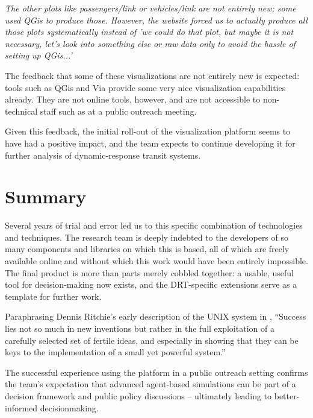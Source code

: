 \begin{displayquote}\emph{
  The other plots like passengers/link or vehicles/link are not entirely new; some used QGis to produce those. However, the website forced us to actually produce all those plots systematically instead of 'we could do that plot, but maybe it is not necessary, let's look into something else or raw data only to avoid the hassle of setting up QGis...'
}\end{displayquote}

\normalsize

The feedback that some of these visualizations are not entirely new is expected: tools such as QGis and Via provide some very nice visualization capabilities already. They are not online tools, however, and are not accessible to non-technical staff such as at a public outreach meeting.

Given this feedback, the initial roll-out of the visualization platform seems to have had a positive impact, and the team expects to continue developing it for further analysis of dynamic-response transit systems.

\section{Summary}
\label{avov-summary}

Several years of trial and error led us to this specific combination of technologies and techniques. The research team is deeply indebted to the developers of so many components and libraries on which this is based, all of which are freely available online and without which this work would have been entirely impossible. The final product is more than parts merely cobbled together: a usable, useful tool for decision-making now exists, and the DRT-specific extensions serve as a template for further work.

Paraphrasing Dennis Ritchie's early description of the UNIX system in \citet{Ritchie1978unix}, ``Success lies not so much in new inventions but rather in the full exploitation of a carefully selected set of fertile ideas, and especially in showing that they can be keys to the implementation of a small yet powerful system.''

The successful experience using the platform in a public outreach setting confirms the team's expectation that advanced agent-based simulations can be part of a decision framework and public policy discussions -- ultimately leading to better-informed decisionmaking.

